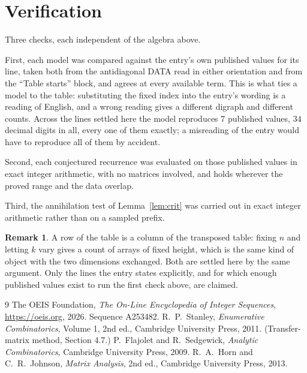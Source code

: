\documentclass[11pt,a4paper]{article}
\theoremstyle{plain}
\theoremstyle{definition}
\newtheorem{remark}[theorem]{Remark}
\begin{document}
\section{Verification}

Three checks, each independent of the algebra above.

First, each model was compared against the entry's own published values for its line, taken
both from the antidiagonal DATA read in either orientation and from the ``Table starts''
block, and agrees at every available term. This is what ties a model to the table:
substituting the fixed index into the entry's wording is a reading of English, and a wrong
reading gives a different digraph and different counts. Across the lines settled here the
model reproduces $7$ published values, $34$ decimal digits in all, every one of
them exactly; a misreading of the entry would have to reproduce all of them by accident.

Second, each conjectured recurrence was evaluated on those published values in exact
integer arithmetic, with no matrices involved, and holds wherever the proved range and the
data overlap.

Third, the annihilation test of Lemma~\ref{lem:crit} was carried out in exact integer
arithmetic rather than on a sampled prefix.

\begin{remark}
A row of the table is a column of the transposed table: fixing $n$ and letting $k$ vary gives a
count of arrays of fixed height, which is the same kind of object with the two dimensions
exchanged. Both are settled here by the same argument. Only the lines the entry states
explicitly, and for which enough published values exist to run the first check above, are
claimed.
\end{remark}

\begin{thebibliography}{9}
 The OEIS Foundation, \emph{The On-Line Encyclopedia of Integer
Sequences}, \url{https://oeis.org}, 2026. Sequence A253482.
 R.~P.~Stanley, \emph{Enumerative Combinatorics}, Volume 1, 2nd ed.,
Cambridge University Press, 2011. (Transfer-matrix method, Section 4.7.)
 P.~Flajolet and R.~Sedgewick, \emph{Analytic Combinatorics}, Cambridge
University Press, 2009.
 R.~A.~Horn and C.~R.~Johnson, \emph{Matrix Analysis}, 2nd ed., Cambridge
University Press, 2013.
\end{thebibliography}
\end{document}
